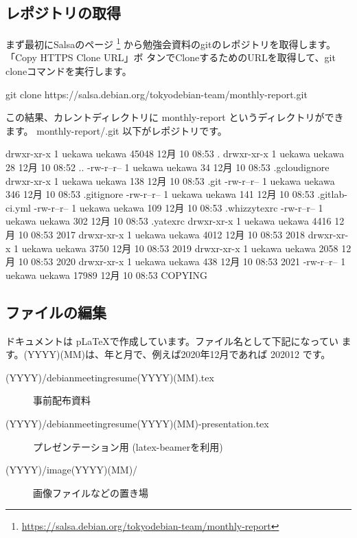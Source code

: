 \documentclass[mingoth,a4paper]{jsarticle}
\begin{document}
\subsection{レポジトリの取得}

まず最初にSalsaのページ
\footnote{\url{https://salsa.debian.org/tokyodebian-team/monthly-report}}
から勉強会資料のgitのレポジトリを取得します。「Copy HTTPS Clone URL」ボ
タンでCloneするためのURLを取得して、git cloneコマンドを実行します。

\begin{commandline}
 git clone https://salsa.debian.org/tokyodebian-team/monthly-report.git
\end{commandline}

この結果、カレントディレクトリに monthly-report というディレクトリができ
ます。
monthly-report/.git 以下がレポジトリです。

\begin{commandline}
drwxr-xr-x 1 uekawa uekawa  45048 12月 10 08:53 .
drwxr-xr-x 1 uekawa uekawa     28 12月 10 08:52 ..
-rw-r--r-- 1 uekawa uekawa     34 12月 10 08:53 .gcloudignore
drwxr-xr-x 1 uekawa uekawa    138 12月 10 08:53 .git
-rw-r--r-- 1 uekawa uekawa    346 12月 10 08:53 .gitignore
-rw-r--r-- 1 uekawa uekawa    141 12月 10 08:53 .gitlab-ci.yml
-rw-r--r-- 1 uekawa uekawa    109 12月 10 08:53 .whizzytexrc
-rw-r--r-- 1 uekawa uekawa    302 12月 10 08:53 .yatexrc
drwxr-xr-x 1 uekawa uekawa   4416 12月 10 08:53 2017
drwxr-xr-x 1 uekawa uekawa   4012 12月 10 08:53 2018
drwxr-xr-x 1 uekawa uekawa   3750 12月 10 08:53 2019
drwxr-xr-x 1 uekawa uekawa   2058 12月 10 08:53 2020
drwxr-xr-x 1 uekawa uekawa    438 12月 10 08:53 2021
-rw-r--r-- 1 uekawa uekawa  17989 12月 10 08:53 COPYING
\end{commandline}

\subsection{ファイルの編集}

ドキュメントは p\LaTeX{}で作成しています。ファイル名として下記になってい
ます。(YYYY)(MM)は、年と月で、例えば2020年12月であれば 202012 です。

\begin{description}
 \item[(YYYY)/debianmeetingresume(YYYY)(MM).tex]
	    事前配布資料
 \item[(YYYY)/debianmeetingresume(YYYY)(MM)-presentation.tex]
	    プレゼンテーション用 (latex-beamerを利用)
 \item[(YYYY)/image(YYYY)(MM)/]
	    画像ファイルなどの置き場
\end{description}
\end{document}
